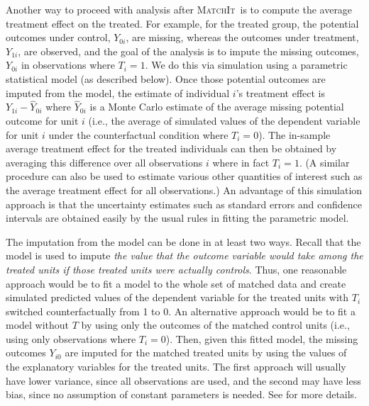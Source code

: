 \documentclass[oneside,letterpaper,titlepage]{article}
\newcommand{\MatchIt}{\textsc{MatchIt}}
\begin{document}
Another way to proceed with analysis after \MatchIt\ is to compute the
average treatment effect on the treated.  For example, for the treated
group, the potential outcomes under control, $Y_{0i}$, are missing,
whereas the outcomes under treatment, $Y_{1i}$, are observed, and the
goal of the analysis is to impute the missing outcomes, $Y_{0i}$ in
observations where $T_i=1$.  We do this via simulation using a
parametric statistical model (as described below).  Once those
potential outcomes are imputed from the model, the estimate of
individual $i$'s treatment effect is $Y_{1i}-\widehat{Y}_{0i}$ where
$\widehat{Y}_{0i}$ is a Monte Carlo estimate of the average missing
potential outcome for unit $i$ (i.e., the average of simulated values
of the dependent variable for unit $i$ under the counterfactual
condition where $T_i=0$).  The in-sample average treatment effect for
the treated individuals can then be obtained by averaging this
difference over all observations $i$ where in fact $T_i=1$.  (A
similar procedure can also be used to estimate various other
quantities of interest such as the average treatment effect for all
observations.)  An advantage of this simulation approach is that the
uncertainty estimates such as standard errors and confidence intervals
are obtained easily by the usual rules in fitting the parametric
model.

The imputation from the model can be done in at least two ways.
Recall that the model is used to impute \emph{the value that the
  outcome variable would take among the treated units if those treated
  units were actually controls}.  Thus, one reasonable approach would
be to fit a model to the whole set of matched data and create
simulated predicted values of the dependent variable for the treated
units with $T_i$ switched counterfactually from 1 to 0.  An
alternative approach would be to fit a model without $T$ by using only
the outcomes of the matched control units (i.e., using only
observations where $T_i=0$).  Then, given this fitted model, the
missing outcomes $Y_{i0}$ are imputed for the matched treated units by
using the values of the explanatory variables for the treated units.
The first approach will usually have lower variance, since all
observations are used, and the second may have less bias, since no
assumption of constant parameters is needed.  See \citet*{HoImaKin05}
for more details.

\end{document}
